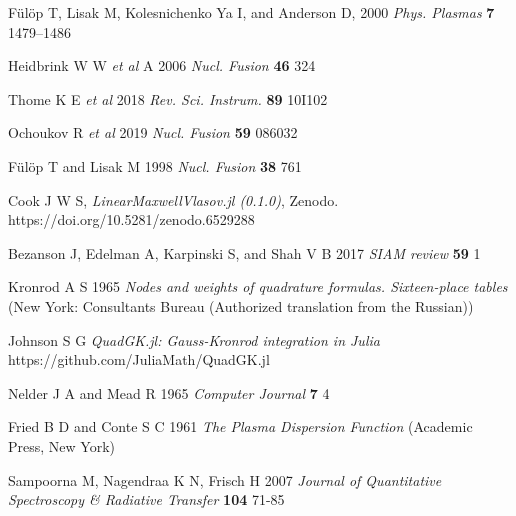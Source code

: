 \documentclass[12pt]{iopart}
\begin{document}
\begin{thebibliography}{9}
F{\"u}l{\"o}p T, Lisak M, Kolesnichenko Ya I, and Anderson D, 2000 \textit{Phys. Plasmas} \textbf{7} 1479–1486

Heidbrink W W \textit{et al} A 2006 \textit{Nucl. Fusion} \textbf{46} 324

Thome K E \textit{et al} 2018 \textit{Rev. Sci. Instrum.} \textbf{89} 10I102

Ochoukov R \textit{et al} 2019 \textit{Nucl. Fusion} \textbf{59} 086032

F{\"u}l{\"o}p T and Lisak M 1998 \textit{Nucl. Fusion} \textbf{38} 761

  Cook J W S, \textit{LinearMaxwellVlasov.jl (0.1.0)}, Zenodo. https://doi.org/10.5281/zenodo.6529288


Bezanson J, Edelman A, Karpinski S, and Shah V B 2017 \textit{SIAM review} \textbf{59} 1

Kronrod A S 1965 \textit{Nodes and weights of quadrature formulas. Sixteen-place tables} (New York: Consultants Bureau (Authorized translation from the Russian))

Johnson S G \textit{QuadGK.jl: Gauss-Kronrod integration in Julia} https://github.com/JuliaMath/QuadGK.jl

Nelder J A and Mead R 1965 \textit{Computer Journal} \textbf{7} 4

Fried B D and Conte S C 1961 \textit{The Plasma Dispersion Function} (Academic Press, New York)

Sampoorna M, Nagendraa K N, Frisch H 2007 \textit{Journal of Quantitative Spectroscopy \& Radiative Transfer} \textbf{104} 71-85


\end{thebibliography}
\end{document}
